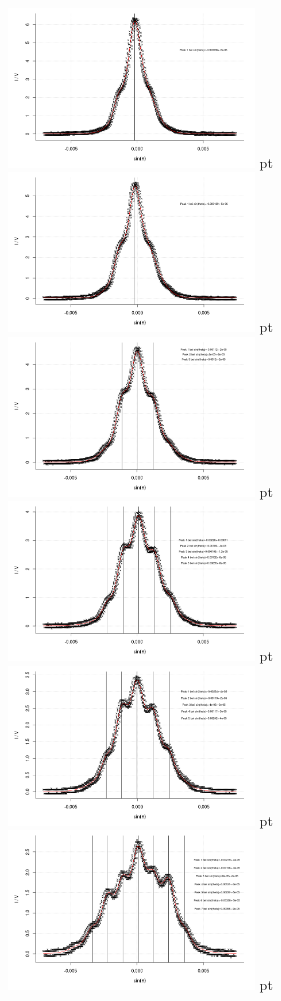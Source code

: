 \documentclass[12pt]{article}
\begin{document}
\begin{minipage}[h!]{\textwidth}
	\centering
	\includegraphics[width=0.49\textwidth]{figures/ultraschall7.png} pt
	\includegraphics[width=0.49\textwidth]{figures/ultraschall8.png} pt
	\includegraphics[width=0.49\textwidth]{figures/ultraschall9.png} pt
	\includegraphics[width=0.49\textwidth]{figures/ultraschall10.png} pt
	\includegraphics[width=0.49\textwidth]{figures/ultraschall11.png} pt
	\includegraphics[width=0.49\textwidth]{figures/ultraschall12.png} pt
\end{minipage}\newpage
\end{document}
